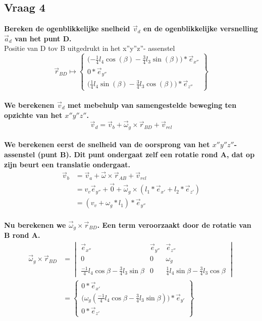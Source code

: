\documentclass[a4paper,10pt]{article}
\begin{document}
\subsection{Vraag 4}
\textbf{Bereken de ogenblikkelijke snelheid $\vec{v}_d$ en de ogenblikkelijke versnelling $\vec{a}_d$ van het punt D.}\\
Positie van D tov B uitgedrukt in het x''y''z''- assenstel\\
\begin{equation}
	\vec{r}_{BD} \mapsto \begin{Bmatrix}
	\Big({-\frac{1}{4}} l_4 \cos(\beta)-\frac{3}{4} l_3 \sin(\beta)\Big)*\vec{e}_{x''}\\
	0 * \vec{e}_{y''}\\
	\Big (\frac{1}{4} l_4 \sin(\beta) - \frac{3}{4} l_3 \cos(\beta)\Big) * \vec{e}_{z''}
	\end{Bmatrix}
\end{equation}\\
\textbf{We berekenen $\vec{v}_d$ met mebehulp van samengestelde beweging ten opzichte van het $x''y''z''$.}\\
\begin{equation}
\label{vd}
\vec{v}_d = \vec{v}_b + \vec{\omega}_g \times \vec{r}_{BD}  +\vec{v}_{rel}
\end{equation}\\
\textbf{We berekenen eerst de snelheid van de oorsprong van het $x''y''z''$-assenstel (punt B). Dit punt ondergaat zelf een rotatie rond A, dat op zijn beurt een translatie ondergaat.}\\
\begin{equation}
\label{vb}
\begin{aligned}
\vec{v}_b &= \vec{v}_a + \vec{\omega}\times\vec{r}_{AB} + \vec{v}_{rel}\\
&= v_v  \vec{e}_{y''} + \vec{0} + \vec{\omega}_g \times (l_1 *\vec{e}_{x'} + l_2 * \vec{e}_{z'})\\
&= (v_v + \omega_g * l_1)*\vec{e}_{y''}
\end{aligned}
\end{equation}\\
\textbf{Nu berekenen we $\vec{\omega}_g \times \vec{r}_{BD}$. Een term veroorzaakt door de rotatie van B rond A. }
\begin{equation}
\label{wrd}
\begin{aligned}
\vec{\omega}_g \times \vec{r}_{BD} & = \begin{vmatrix}
\vec{e}_{x''}& \vec{e}_{y''} & \vec{e}_{z''}\\
0 & 0 & \omega_g \\
\frac{-1}{4} l_4 \cos{\beta} - \frac{3}{4} l_3  \sin{\beta} & 0 &\frac{1}{4} l_4  \sin{\beta}-\frac{3}{4} l_3  \cos{\beta}
\end{vmatrix}\\
&= \begin{Bmatrix}
0 *\vec{e}_{x'}\\
\Big(\omega_g (\frac{-1}{4} l_4 \cos{\beta}-\frac{3}{4} l_3 \sin{\beta})\Big)*\vec{e}_{y'}\\
0 * \vec{e}_{z'}
\end{Bmatrix}
\end{aligned}
\end{equation}\\
\end{document}
